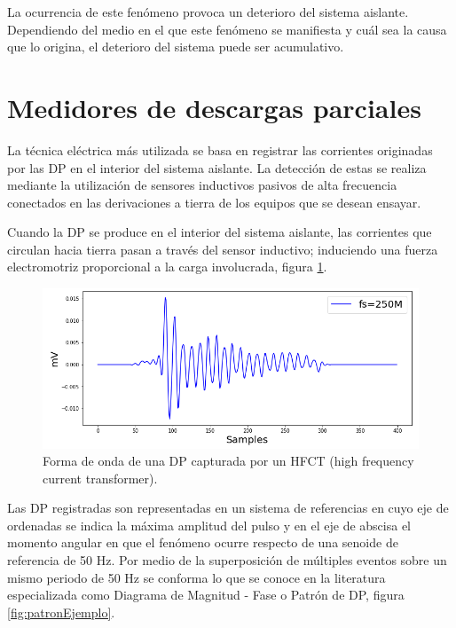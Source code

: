 La ocurrencia de este fenómeno provoca un deterioro del sistema aislante. Dependiendo del medio en el que este fenómeno se manifiesta y cuál sea la causa que lo origina, el deterioro del sistema puede ser acumulativo.

\section{Medidores de descargas parciales}
La técnica eléctrica más utilizada se basa en registrar las corrientes originadas por las DP en el interior del sistema aislante. La detección de estas se realiza mediante la utilización de sensores inductivos pasivos de alta frecuencia conectados en las derivaciones a tierra de los equipos que se desean ensayar.

Cuando la DP se produce en el interior del sistema aislante, las corrientes que circulan hacia tierra pasan a través del sensor inductivo; induciendo una fuerza electromotriz proporcional a la carga involucrada, figura \ref{fig:dpEjemplo}.

\begin{figure}[ht]
	\centering
	\includegraphics[width=\textwidth]{./Figures/dpEjemplo.png}
	\caption{Forma de onda de una DP capturada por un HFCT (high frequency current transformer).}
	\label{fig:dpEjemplo}
\end{figure}

Las DP registradas son representadas en un sistema de referencias en cuyo eje de ordenadas se indica la máxima amplitud del pulso y en el eje de abscisa el momento angular en que el fenómeno ocurre respecto de una senoide de referencia de 50 Hz. Por medio de la superposición de múltiples eventos sobre un mismo periodo de 50 Hz se conforma lo que se conoce en la literatura especializada como Diagrama de Magnitud - Fase o Patrón de DP, figura \ref{fig:patronEjemplo}.

